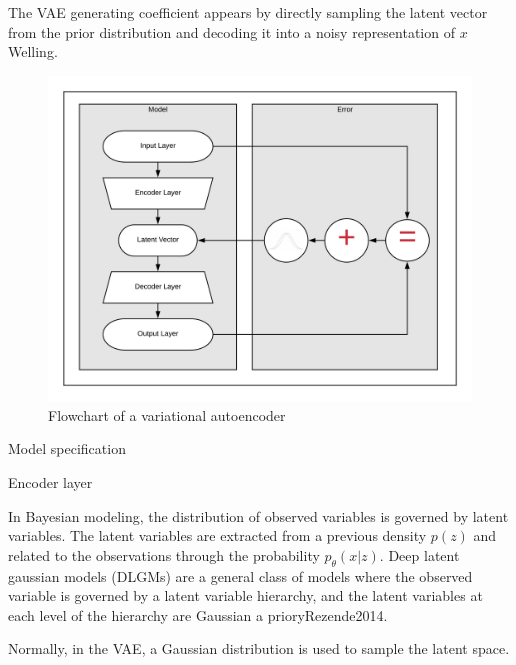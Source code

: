 \documentclass[a4paper, 12pt]{ppgeb}
\makeatletter
\renewcommand{\subsection}{\@startsection
{subsection}
{2}
{0mm}
{-\baselineskip}
{0.5\baselineskip}
{\bf\sffamily}}
\renewcommand{\subsubsection}{\@startsection
{subsubsection}
{3}
{0mm}
{-\baselineskip}
{0.5\baselineskip}
{\bf\sffamily}}
\makeatother
\begin{document}
The \ac{VAE} generating coefficient appears by directly sampling the latent vector from the prior distribution and decoding it into a noisy representation of \( x \)\cite{mainreferences}{Welling}.

\begin{figure}
	\begin{center}
	\includegraphics[width=.8\linewidth]{VAE_Diagram.png}
	\end{center}
	\caption{Flowchart of a variational autoencoder} \label{fig2}
\end{figure}

 

\subsection{Model specification}

\subsubsection{Encoder layer}

In Bayesian modeling, the distribution of observed variables is governed by latent variables. The latent variables are extracted from a previous density \( p(z)\) and related to the observations through the probability \( p_\theta(x|z)\). Deep latent gaussian models (DLGMs) are a general class of models where the observed variable is governed by a latent variable hierarchy, and the latent variables at each level of the hierarchy are Gaussian a priory\cite{mainreferences}{Rezende2014}.

Normally, in the \ac{VAE}, a Gaussian distribution is used to sample the latent space.
\end{document}
